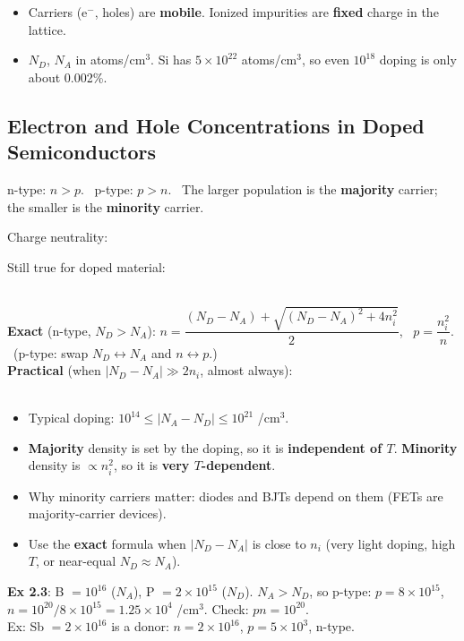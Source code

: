     \begin{handy}
        \begin{itemize}
            \item Carriers (e$^-$, holes) are \textbf{mobile}. Ionized impurities are \textbf{fixed} charge in the lattice.
            \item $N_D$, $N_A$ in atoms/cm$^3$. Si has $5\times10^{22}$ atoms/cm$^3$, so even $10^{18}$ doping is only about 0.002\%.
        \end{itemize}
    \end{handy}

    \subsection[2.6]{Electron and Hole Concentrations in Doped Semiconductors}
    n-type: $n > p$. \ p-type: $p > n$. \ The larger population is the \textbf{majority} carrier; the smaller is the \textbf{minority} carrier.\\
    \begin{minipage}[t]{0.49\linewidth}\raggedright
        Charge neutrality: 
    \end{minipage}\hfill
    \begin{minipage}[t]{0.49\linewidth}\raggedright
        Still true for doped material: 
    \end{minipage}\\[2pt]
    \textbf{Exact} (n-type, $N_D > N_A$): 
    $n = \dfrac{(N_D - N_A) + \sqrt{(N_D - N_A)^2 + 4n_i^2}}{2}$, \ $p = \dfrac{n_i^2}{n}$. \ (p-type: swap $N_D \leftrightarrow N_A$ and $n \leftrightarrow p$.) \\[1pt]
    \textbf{Practical} (when $|N_D - N_A| \gg 2n_i$, almost always): \\
    \\
    \begin{itemize}
        \item Typical doping: $10^{14} \le |N_A - N_D| \le 10^{21}$ /cm$^3$.
        \item \textbf{Majority} density is set by the doping, so it is \textbf{independent of $T$}. \textbf{Minority} density is $\propto n_i^2$, so it is \textbf{very $T$-dependent}.
        \item Why minority carriers matter: diodes and BJTs depend on them (FETs are majority-carrier devices). 
        \item Use the \textbf{exact} formula when $|N_D - N_A|$ is close to $n_i$ (very light doping, high $T$, or near-equal $N_D \approx N_A$).
    \end{itemize}
    \textbf{Ex 2.3}: B $= 10^{16}$ ($N_A$), P $= 2\times10^{15}$ ($N_D$). $N_A > N_D$, so p-type: $p = 8\times10^{15}$, $n = 10^{20}/8\times10^{15} = 1.25\times10^4$ /cm$^3$. Check: $pn = 10^{20}$. \\
    Ex: Sb $= 2\times10^{16}$ is a donor: $n = 2\times10^{16}$, $p = 5\times10^3$, n-type.

